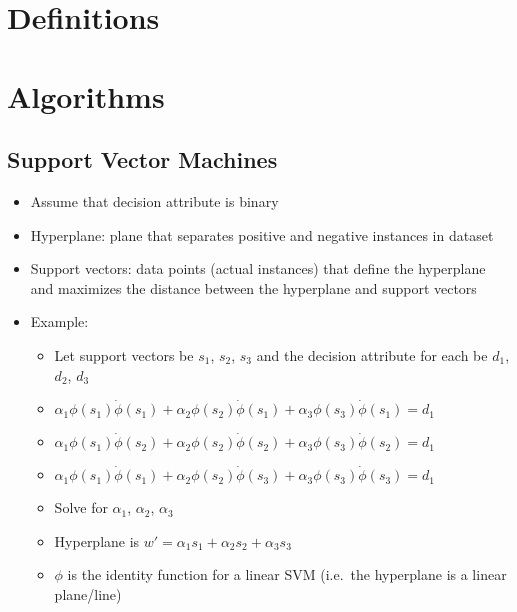 \documentclass{article}
\begin{document}
\section{Definitions}

\section{Algorithms}

\subsection{Support Vector Machines}
\begin{itemize}
	\item Assume that decision attribute is binary
	\item Hyperplane: plane that separates positive and negative instances in dataset
	\item Support vectors: data points (actual instances) that define the hyperplane and maximizes the distance between the hyperplane and support vectors
	\item Example:
		\begin{itemize}
			\item Let support vectors be $s_1$, $s_2$, $s_3$ and the decision attribute for each be $d_1$, $d_2$, $d_3$
			\item $\alpha_1 \phi(s_1) \dot \phi(s_1) + \alpha_2 \phi(s_2) \dot \phi(s_1) + \alpha_3 \phi(s_3) \dot \phi(s_1) = d_1$
			\item $\alpha_1 \phi(s_1) \dot \phi(s_2) + \alpha_2 \phi(s_2) \dot \phi(s_2) + \alpha_3 \phi(s_3) \dot \phi(s_2) = d_1$
			\item $\alpha_1 \phi(s_1) \dot \phi(s_1) + \alpha_2 \phi(s_2) \dot \phi(s_3) + \alpha_3 \phi(s_3) \dot \phi(s_3) = d_1$
			\item Solve for $\alpha_1$, $\alpha_2$, $\alpha_3$
			\item Hyperplane is $w' = \alpha_1 s_1 + \alpha_2 s_2 + \alpha_3 s_3$
			\item $\phi$ is the identity function for a linear SVM (i.e.\ the hyperplane is a linear plane/line)
			
		\end{itemize}
	\end{itemize}
\end{document}
